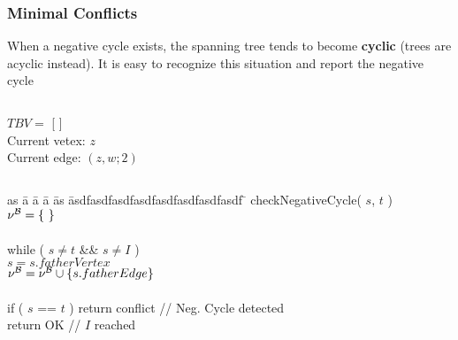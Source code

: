 \begin{frame}
  \frametitle{Minimal Conflicts}

  \scriptsize

  When a negative cycle exists, the spanning tree tends
  to become {\bf cyclic} (trees are acyclic instead). It is
  easy to recognize this situation and report the negative cycle

  \vfill
  \pause

  \begin{columns}

  \begin{column}{.45\textwidth}
    $TBV =$ [ ] \\
    Current vetex: $z$ \\
    Current edge: $(z,w;2)$ 
  \end{column}

  \begin{column}{.45\textwidth}
    \begin{center}
    \begin{overlayarea}{\textwidth}{3cm}
      
    \end{overlayarea}
    \end{center}
  \end{column}

  \end{columns}

  \vfill
  \pause

  \begin{tabbing}
  as \= a \= a \= a \= as \= asdfasdfasdfasdfasdfasdfasdfasdf \= \kill
  checkNegativeCycle( $s$, $t$ ) \\
  \> $\nu^{\mathcal{B}} = \{ \ \}$ \\ \\
  \> while ( $s \not= t$ \&\& $s \not= I$ ) \\
  \> \> $s = s.fatherVertex$ \\
  \> \> $\nu^{\mathcal{B}} = \nu^{\mathcal{B}} \cup \{ s.fatherEdge \}$ \\ \\
  \> if ( $s$ == $t$ ) return conflict \>\>\>\>\> // Neg. Cycle detected \\
  \> return OK        \>\>\>\>\> // $I$ reached
  \end{tabbing}

\end{frame}


